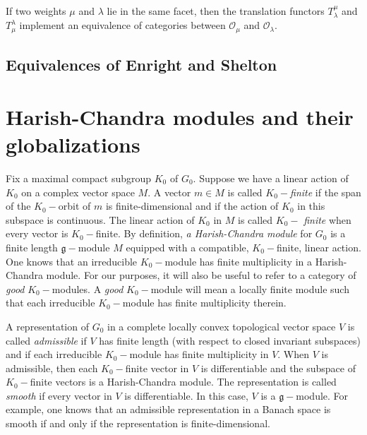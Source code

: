 \begin{theorem}\label{thm:translation}
 If two weights $\mu$ and $\lambda$ lie in the same facet, then the translation functors $T_\lambda^\mu$ and $T_\mu^\lambda$ implement an equivalence of categories between $\mathcal{O}_\mu$ and $\mathcal{O}_\lambda$.
\end{theorem}


\subsection{Equivalences of Enright and Shelton}

\section{Harish-Chandra modules and their globalizations}


\noindent Fix a maximal compact subgroup $K_{0}$ of $G_{0}$. Suppose we have
a linear action of $K_{0}$ on a complex vector space $M$. A vector $m\in M$
is called $K_{0}-$\emph{finite} if the span of the $K_{0}-$orbit of $m$ is
finite-dimensional and if the action of $K_{0}$ in this subspace is
continuous. The linear action of $K_{0}$ in $M$ is called $K_{0}-$\emph{%
finite }when every vector is $K_{0}-$finite. By definition, \emph{a
Harish-Chandra module} for $G_{0}$ is a finite length $\mathfrak{g}-$module $%
M$ equipped with a compatible, $K_{0}-$finite, linear action. One knows that
an irreducible $K_{0}-$module has finite multiplicity in a Harish-Chandra
module. For our purposes, it will also be useful to refer to a category of
\emph{good }$K_{0}-$modules. A \emph{good }$K_{0}-$module will mean a
locally finite module such that each irreducible $K_{0}-$module has finite
multiplicity therein.

\smallskip

\noindent A representation of $G_{0}$ in a complete locally convex
topological vector space $V$ is called \emph{admissible} if $V$ has finite
length (with respect to closed invariant subspaces) and if each irreducible $%
K_{0}-$module has finite multiplicity in $V$. When $V$ is admissible, then
each $K_{0}-$finite vector in $V$ is differentiable and the subspace of $%
K_{0}-$finite vectors is a Harish-Chandra module. The representation is
called \emph{smooth} if every vector in $V$ is differentiable. In this case,
$V$ is a $\mathfrak{g}-$module. For example, one knows that an admissible
representation in a Banach space is smooth if and only if the representation
is finite-dimensional.

